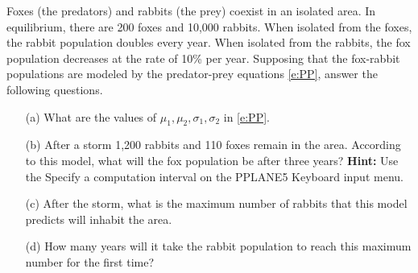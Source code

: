 \documentclass{ximera}
\begin{document}
\begin{exercise} \label{c9.1.8}
Foxes (the predators) and rabbits (the prey) coexist in an isolated area.
In equilibrium, there are 200 foxes and 10,000 rabbits.  When isolated from
the foxes, the rabbit population doubles every year.  When isolated from 
the rabbits, the fox population decreases at the rate of 10\% per year. 
Supposing that the fox-rabbit populations are modeled by the predator-prey
equations \eqref{e:PP}, answer the following questions.
\begin{itemize}
\item[(a)]  	What are the values of $\mu_1,\mu_2,\sigma_1,\sigma_2$ in 
\eqref{e:PP}.
\item[(b)]	After a storm 1,200 rabbits and 110 foxes remain in the area.
According to this model, what will the fox population be after three years?  
{\bf Hint:}  Use the {\sf Specify a computation interval} on the 
{\sf PPLANE5 Keyboard input} menu.
\item[(c)]	After the storm, what is the maximum number of rabbits that 
this model predicts will inhabit the area.
\item[(d)]	How many years will it take the rabbit population to reach 
this maximum number for the first time?
\end{itemize}
\end{exercise}
\end{document}
